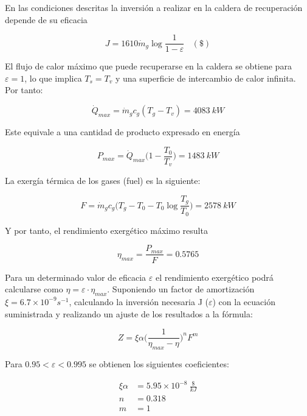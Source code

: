 \documentclass[12pt, letterpaper]{article}
\begin{document}
En las condiciones descritas la inversión a realizar en la caldera de recuperación depende de su eficacia

\begin{equation}
	J = 1610 \dot{m}_g \log{\frac{1}{1-\varepsilon}} \ \ \ \ (\$)
\end{equation}

El flujo de calor máximo que puede recuperarse en la caldera se obtiene para $\varepsilon = 1$, lo que implica $T_s = T_v$ y una superficie de intercambio de calor infinita. Por tanto:

\begin{equation}
	\dot{Q}_{max} = \dot{m}_g c_g (T_g - T_v) = 4083\ kW
\end{equation}

Este equivale a una cantidad de producto expresado en energía

\begin{equation}
	P_{max} = \dot{Q}_{max}\bigg(1 - \frac{T_0}{T_v}\bigg) = 1483\ kW
\end{equation}

La exergía térmica de los gases (fuel) es la siguiente:

\begin{equation}
	F = \dot{m}_g c_g \Bigg(T_g - T_0 - T_0\log{\frac{T_g}{T_0}}\Bigg) = 2578\ kW
\end{equation}

Y por tanto, el rendimiento exergético máximo resulta

\begin{equation}
	\eta_{max} = \frac{P_{max}}{F} = 0.5765
\end{equation}

Para un determinado valor de eficacia $\varepsilon$ el rendimiento exergético podrá calcularse como $\eta = \varepsilon \cdot \eta_{max}$. Suponiendo un factor de amortización $\xi = 6.7 \times 10^{-9} s^{-1}$, calculando la inversión necesaria J ($\varepsilon$) con la ecuación suministrada y realizando un ajuste de los resultados a la fórmula:

\begin{equation}
	Z = \xi \alpha \Bigg(\frac{1}{\eta_{max} - \eta} \Bigg)^n F^m
\end{equation}

Para $0.95 < \varepsilon < 0.995$ se obtienen los siguientes coeficientes:

\begin{equation}
	\begin{split}
		\xi \alpha &= 5.95 \times 10^{-8}\ \frac{\$}{kJ}\\
		n &= 0.318\\
		m &= 1
	\end{split}
\end{equation}
\end{document}

